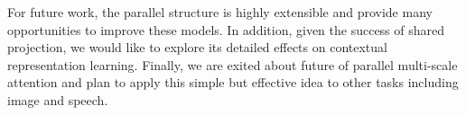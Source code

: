 \documentclass{article} \usepackage{iclr2020_conference,times}
\begin{document}
For future work, the parallel structure is highly extensible and provide many opportunities to improve these models. In addition, given the success of shared projection, we would like to explore its detailed effects on contextual representation learning. Finally, we are exited about future of parallel multi-scale attention and plan to apply this simple but effective idea to other tasks including image and speech.
\end{document}
